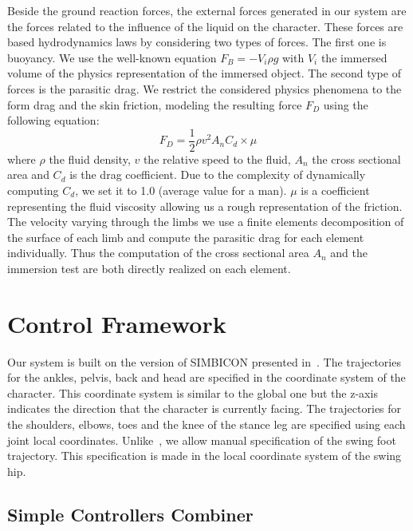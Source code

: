 \documentclass[conference]{acmsiggraph}
\begin{document}
Beside the ground reaction forces, the external forces generated in our system are the forces related to the influence of the liquid on the character. These forces are based hydrodynamics laws by considering two types of forces. The first one is buoyancy. We use the well-known equation $F_{B}=-V_i \rho g$ with $V_i$ the immersed volume of the physics representation of the immersed object. The second type of forces is the parasitic drag. We restrict the considered physics phenomena to the form drag and the skin friction, modeling the resulting force $F_D$ using the following equation:
$$
F_D=\frac{1}{2} \rho v^2 A_n C_d \times \mu
$$
where  $\rho$ the fluid density, $v$ the relative speed to the fluid, $A_n$ the cross sectional area and $C_d$ is the drag coefficient. Due to the complexity of dynamically computing $C_d$, we set it to 1.0 (average value for a man). $\mu$ is a coefficient representing the fluid viscosity allowing us a rough representation of the friction. The velocity varying through the limbs we use a finite elements decomposition of the surface of each limb and compute the parasitic drag for each element individually. Thus the computation of the cross sectional area $A_n$ and the immersion test are both directly realized on each element.

\section{Control Framework}
\label{sec:control_framework}

Our system is built on the version of SIMBICON presented in~\cite{coros2010generalized}. The trajectories for the ankles, pelvis, back and head are specified in the coordinate system of the character. This coordinate system is similar to the global one but the z-axis indicates the direction that the character is currently facing. The trajectories for the shoulders, elbows, toes and the knee of the stance leg are specified using each joint local coordinates. Unlike~\cite{coros2010generalized}, we allow manual specification of the swing foot trajectory. This specification is made in the local coordinate system of the swing hip.

\subsection{Simple Controllers Combiner}
\label{sec:multi_state}
\end{document}
